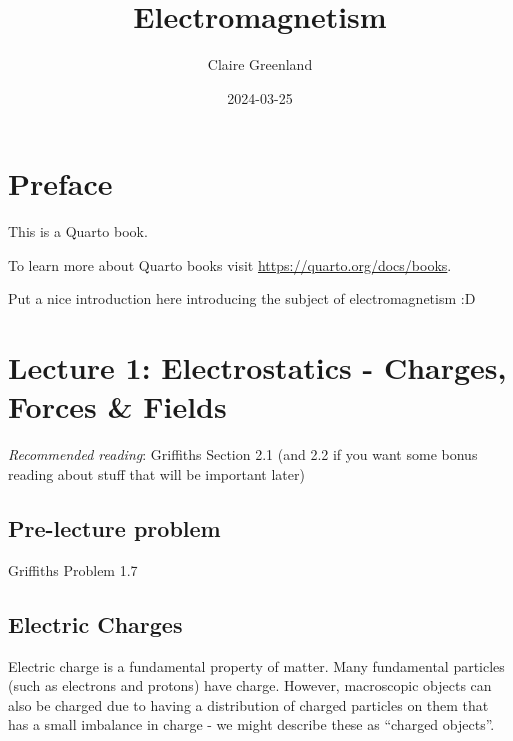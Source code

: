 \documentclass[
  letterpaper,
  DIV=11,
  numbers=noendperiod]{scrreprt}
\title{Electromagnetism}
\author{Claire Greenland}
\date{2024-03-25}
\renewcommand*\contentsname{Table of contents}
\newcommand\contentsname{Table of contents}
\begin{document}
\maketitle

\renewcommand*\contentsname{Table of contents}
{
\hypersetup{linkcolor=}
\setcounter{tocdepth}{2}
\tableofcontents
}

\chapter*{Preface}\label{preface}


This is a Quarto book.

To learn more about Quarto books visit
\url{https://quarto.org/docs/books}.

Put a nice introduction here introducing the subject of electromagnetism
:D


\chapter{Lecture 1: Electrostatics - Charges, Forces \&
Fields}\label{lecture-1-electrostatics---charges-forces-fields}

\newcommand{\l}{\mathrm{\mathbf{l}}}
\newcommand{\E}{\mathrm{\mathbf{E}}}
\newcommand{\F}{\mathrm{\mathbf{F}}}
\newcommand{\r}{\mathrm{\mathbf{r}}}

\newcommand{\x}{\mathrm{\mathbf{x}}}
\newcommand{\y}{\mathrm{\mathbf{y}}}
\newcommand{\z}{\mathrm{\mathbf{z}}}

\emph{Recommended reading}: Griffiths Section 2.1 (and 2.2 if you want
some bonus reading about stuff that will be important later)

\section{Pre-lecture problem}\label{pre-lecture-problem}

Griffiths Problem 1.7

\section{Electric Charges}\label{electric-charges}

Electric charge is a fundamental property of matter. Many fundamental
particles (such as electrons and protons) have charge. However,
macroscopic objects can also be charged due to having a distribution of
charged particles on them that has a small imbalance in charge - we
might describe these as ``charged objects''.
\end{document}
